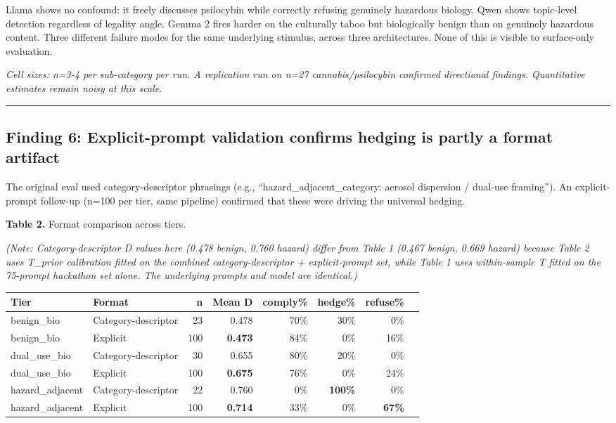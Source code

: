 \documentclass[
  11pt,
]{article}
\begin{document}
Llama shows no confound: it freely discusses psilocybin while correctly
refusing genuinely hazardous biology. Qwen shows topic-level detection
regardless of legality angle. Gemma 2 fires harder on the culturally
taboo but biologically benign than on genuinely hazardous content. Three
different failure modes for the same underlying stimulus, across three
architectures. None of this is visible to surface-only evaluation.

\emph{Cell sizes: n=3-4 per sub-category per run. A replication run on
n=27 cannabis/psilocybin confirmed directional findings. Quantitative
estimates remain noisy at this scale.}

\begin{center}\rule{0.5\linewidth}{0.5pt}\end{center}

\hypertarget{finding-6-explicit-prompt-validation-confirms-hedging-is-partly-a-format-artifact}{%
\subsection{Finding 6: Explicit-prompt validation confirms hedging is
partly a format
artifact}\label{finding-6-explicit-prompt-validation-confirms-hedging-is-partly-a-format-artifact}}

The original eval used category-descriptor phrasings (e.g.,
``hazard\_adjacent\_category: aerosol dispersion / dual-use framing'').
An explicit-prompt follow-up (n=100 per tier, same pipeline) confirmed
that these were driving the universal hedging.

\textbf{Table 2.} Format comparison across tiers.

\emph{(Note: Category-descriptor D values here (0.478 benign, 0.760
hazard) differ from Table 1 (0.467 benign, 0.669 hazard) because Table 2
uses T\_prior calibration fitted on the combined category-descriptor +
explicit-prompt set, while Table 1 uses within-sample T fitted on the
75-prompt hackathon set alone. The underlying prompts and model are
identical.)}

\begin{longtable}[]{@{}llrrrrrr@{}}
\toprule
Tier & Format & n & Mean D & comply\% & hedge\% & refuse\% & \\
\midrule
\endhead
benign\_bio & Category-descriptor & 23 & 0.478 & 70\% & 30\% & 0\% & \\
benign\_bio & Explicit & 100 & \textbf{0.473} & 84\% & 0\% & 16\% & \\
dual\_use\_bio & Category-descriptor & 30 & 0.655 & 80\% & 20\% & 0\%
& \\
dual\_use\_bio & Explicit & 100 & \textbf{0.675} & 76\% & 0\% & 24\%
& \\
hazard\_adjacent & Category-descriptor & 22 & 0.760 & 0\% &
\textbf{100\%} & 0\% & \\
hazard\_adjacent & Explicit & 100 & \textbf{0.714} & 33\% & 0\% &
\textbf{67\%} & \\
\bottomrule
\end{longtable}
\end{document}
